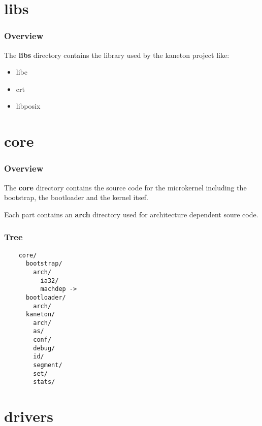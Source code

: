 \documentclass[8pt]{beamer}
\newcommand{\nl}[0]{\vspace{0.4cm}}
\begin{document}
%
%

\section{libs}


\begin{frame}
  \frametitle{Overview}

  The \textbf{libs} directory contains the library used by the kaneton
  project like:

  \begin{itemize}
    \item
      libc
    \item
      crt
    \item
      libposix
  \end{itemize}
\end{frame}

%
%

\section{core}


\begin{frame}
  \frametitle{Overview}

  The \textbf{core} directory contains the source code for the microkernel
  including the bootstrap, the bootloader and the kernel itsef.

  \nl

  Each part contains an \textbf{arch} directory used for architecture
  dependent soure code.
\end{frame}


\begin{frame}[containsverbatim]
  \frametitle{Tree}

  \begin{verbatim}
    core/
      bootstrap/
        arch/
          ia32/
          machdep ->
      bootloader/
        arch/
      kaneton/
        arch/
        as/
        conf/
        debug/
        id/
        segment/
        set/
        stats/
  \end{verbatim}
\end{frame}

%
%

\section{drivers}
\end{document}
